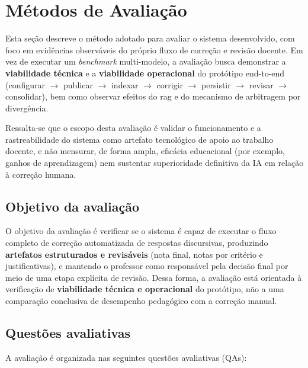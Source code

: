 \section{Métodos de Avaliação}

Esta seção descreve o método adotado para avaliar o sistema desenvolvido, com foco em evidências observáveis do próprio fluxo de correção e revisão docente. Em vez de executar um \textit{benchmark} multi-modelo, a avaliação busca demonstrar a \textbf{viabilidade técnica} e a \textbf{viabilidade operacional} do protótipo end-to-end (configurar \(\rightarrow\) publicar \(\rightarrow\) indexar \(\rightarrow\) corrigir \(\rightarrow\) persistir \(\rightarrow\) revisar \(\rightarrow\) consolidar), bem como observar efeitos do \gls{rag} e do mecanismo de arbitragem por divergência.

Ressalta-se que o escopo desta avaliação é validar o funcionamento e a rastreabilidade do sistema como artefato tecnológico de apoio ao trabalho docente, e não mensurar, de forma ampla, eficácia educacional (por exemplo, ganhos de aprendizagem) nem sustentar superioridade definitiva da IA em relação à correção humana.

\subsection{Objetivo da avaliação}
O objetivo da avaliação é verificar se o sistema é capaz de executar o fluxo completo de correção automatizada de respostas discursivas, produzindo \textbf{artefatos estruturados e revisáveis} (nota final, notas por critério e justificativas), e mantendo o professor como responsável pela decisão final por meio de uma etapa explícita de revisão. Dessa forma, a avaliação está orientada à verificação de \textbf{viabilidade técnica e operacional} do protótipo, não a uma comparação conclusiva de desempenho pedagógico com a correção manual.

\subsection{Questões avaliativas}
A avaliação é organizada nas seguintes questões avaliativas (QAs):

